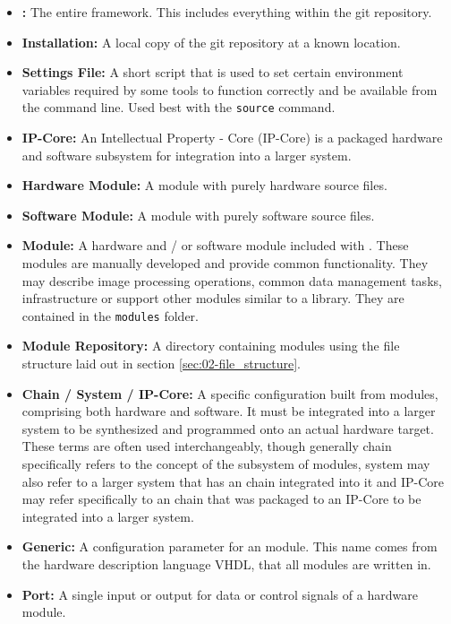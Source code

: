 \begin{itemize}
\item \textbf{\asterics:} The entire framework. This includes everything within the git repository.
\item \textbf{\asterics Installation:} A local copy of the \asterics git repository at a known location.
\item \textbf{\asterics Settings File:} A short script that is used to set certain environment variables required by some tools to function correctly and be available from the command line. Used best with the \texttt{source} command.
\item \textbf{IP-Core:} An Intellectual Property - Core (IP-Core) is a packaged hardware and software subsystem for integration into a larger system.
\item \textbf{Hardware Module:} A module with purely hardware source files. 
\item \textbf{Software Module:} A module with purely software source files.
\item \textbf{\asterics Module:} A hardware and / or software module included with \asterics. These modules are manually developed and provide common functionality. They may describe image processing operations, common data management tasks, infrastructure or support other modules similar to a library. They are contained in the \texttt{modules} folder.
\item \textbf{Module Repository:} A directory containing \asterics modules using the file structure laid out in section \ref{sec:02-file_structure}.
\item \textbf{\asterics Chain / \asterics System / \asterics IP-Core:} A specific configuration built from \asterics modules, comprising both hardware and software.
It must be integrated into a larger system to be synthesized and programmed onto an actual hardware target.
These terms are often used interchangeably, though generally \asterics chain specifically refers to the concept of the \asterics subsystem of modules, \asterics system may also refer to a larger system that has an \asterics chain integrated into it and \asterics IP-Core may refer specifically to an \asterics chain that was packaged to an IP-Core to be integrated into a larger system.
\item \textbf{Generic:} A configuration parameter for an \asterics module. This name comes from the hardware description language VHDL, that all modules are written in.
\item \textbf{Port:} A single input or output for data or control signals of a hardware module.

\end{itemize}
